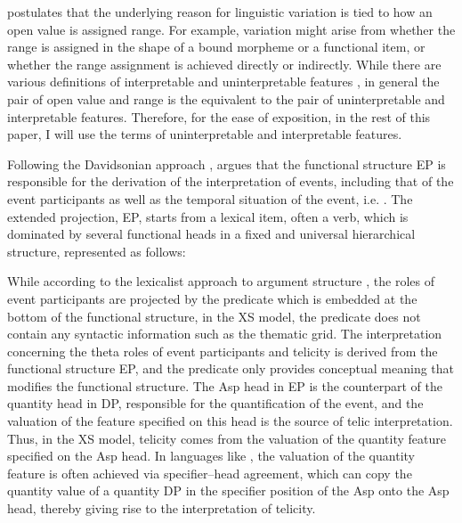 \documentclass[output=paper]{langsci/langscibook}
\begin{document}
\textcite{Borer2005a,Borer2005b,Borer2013} postulates that the underlying reason
for linguistic variation is tied to how an open value is assigned range. For
example, variation might arise from whether the range is assigned in the shape
of a bound morpheme or a functional item, or whether the range assignment is
achieved directly or indirectly. While there are various definitions of
interpretable and uninterpretable features \citep[cf.][]{PesTor2004}, in
general the pair of open value and range is the equivalent to the pair of
uninterpretable and interpretable features. Therefore, for the ease of
exposition, in the rest of this paper, I will use the terms of uninterpretable
and interpretable features.

Following the Davidsonian approach
\citep{davidson1967logical,davidson1980essays,Parsons1990},\linebreak \textcite{Borer2005a}
argues that the functional structure EP is responsible for the derivation of
the interpretation of events, including that of the event participants as well
as the temporal situation of the event, i.e.  . The extended
projection, EP, starts from a lexical item, often a verb, which is dominated by
several functional heads in a fixed and universal hierarchical structure,
represented as follows:\largerpage

\begin{exe}
\ex
{}
\end{exe}

While according to the lexicalist approach to argument structure
\citep[cf.][]{Chomsky1970,Reinhart2002}, the roles of event participants are
projected by the predicate which is embedded at the bottom of the functional
structure, in the XS model, the predicate does not contain any syntactic
information such as the thematic grid. The interpretation concerning the theta
roles of event participants and telicity is derived from the functional
structure EP, and the predicate only provides conceptual meaning that modifies
the functional structure. The Asp head in EP is the counterpart of the
quantity head in DP, responsible for the quantification of the event, and the
valuation of the feature specified on this head is the source of telic
interpretation. Thus, in the XS model, telicity comes from the valuation of the
quantity feature specified on the Asp head. In languages like , the
valuation of the quantity feature is often achieved via specifier--head
agreement, which can copy the quantity value of a quantity DP in the specifier
position of the Asp onto the Asp head, thereby giving rise to the
interpretation of telicity.\largerpage[1.5]
\end{document}
